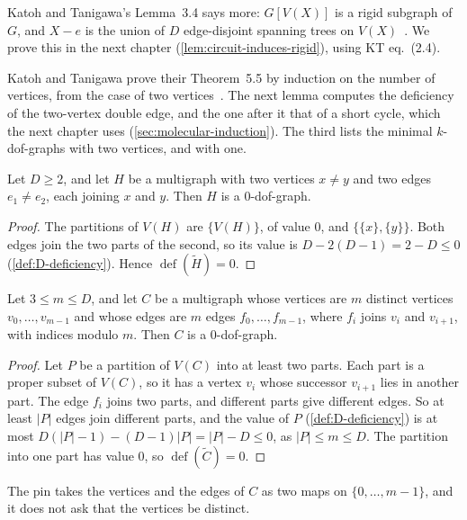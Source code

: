 Katoh and Tanigawa's Lemma~3.4 says more: $G[V(X)]$ is a rigid
subgraph of $G$, and $X - e$ is the union of $D$ edge-disjoint spanning
trees on $V(X)$~\cite[p.~658]{katohTanigawa2011}. We prove this in
the next chapter (\cref{lem:circuit-induces-rigid}), using KT
eq.~(2.4).

Katoh and Tanigawa prove their Theorem~5.5 by induction on the number of
vertices, from the case of two
vertices~\cite[p.~671]{katohTanigawa2011}. The next lemma computes the
deficiency of the two-vertex double edge, and the one after it that of
a short cycle, which the next chapter uses
(\cref{sec:molecular-induction}). The third lists the minimal
$k$-dof-graphs with two vertices, and with one.

\begin{lemma}
  \label{lem:two-vertex-zero-dof}
  \leanok
  Let $D \ge 2$, and let $H$ be a multigraph with two vertices
  $x \neq y$ and two edges $e_1 \neq e_2$, each joining $x$ and $y$.
  Then $H$ is a $0$-dof-graph.
\end{lemma}
\begin{proof}
  \leanok
  The partitions of $V(H)$ are $\{V(H)\}$, of value $0$, and
  $\{\{x\}, \{y\}\}$. Both edges join the two parts of the second, so
  its value is $D - 2(D - 1) = 2 - D \le 0$ (\cref{def:D-deficiency}).
  Hence $\operatorname{def}(\tilde H) = 0$.
\end{proof}

\begin{lemma}
  \label{lem:cycle-zero-dof}
  \leanok
  Let $3 \le m \le D$, and let $C$ be a multigraph whose vertices are
  $m$ distinct vertices $v_0, \dots, v_{m-1}$ and whose edges are $m$
  edges $f_0, \dots, f_{m-1}$, where $f_i$ joins $v_i$ and $v_{i+1}$,
  with indices modulo $m$. Then $C$ is a $0$-dof-graph.
\end{lemma}
\begin{proof}
  \leanok
  Let $P$ be a partition of $V(C)$ into at least two parts. Each part is
  a proper subset of $V(C)$, so it has a vertex $v_i$ whose successor
  $v_{i+1}$ lies in another part. The edge $f_i$ joins two parts, and
  different parts give different edges. So at least $|P|$ edges join
  different parts, and the value of $P$ (\cref{def:D-deficiency}) is at
  most $D(|P| - 1) - (D-1)|P| = |P| - D \le 0$, as $|P| \le m \le D$.
  The partition into one part has value $0$, so
  $\operatorname{def}(\tilde C) = 0$.
\end{proof}
\begin{fmlnote}
  The pin takes the vertices and the edges of $C$ as two maps on
  $\{0, \dots, m-1\}$, and it does not ask that the vertices be distinct.
\end{fmlnote}


